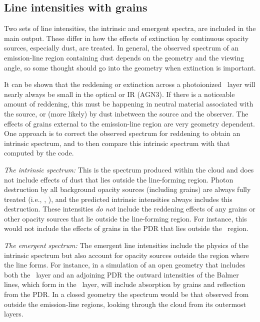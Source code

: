 \subsection{Line intensities with grains}

Two sets of line intensities, the intrinsic and emergent spectra, are
included in the main output.
These differ in how the effects of extinction by continuous opacity sources,
especially dust, are treated.
In general, the observed spectrum of an emission-line
region containing dust depends on the geometry and the viewing angle,
so some thought should go into the geometry when extinction is important.

It can be shown that the reddening or extinction across
a photoionized \hplus\ layer will nearly always be small in the optical or IR (AGN3).
If there is a noticeable amount of reddening, this must be happening in neutral material
associated with the source, or (more likely) by dust inbetween the source and the observer.
The effects of grains external to the emission-line region are very
geometry dependent.
One approach is to correct the observed spectrum for
reddening to obtain an intrinsic spectrum,
and to then compare this intrinsic
spectrum with that computed by the code.

\emph{The intrinsic spectrum:}
This is the spectrum produced within the cloud
and does not include effects of dust that lies outside the line-forming
region.
Photon destruction by all background opacity sources (including
grains) are always fully treated (i.e., \citealp{Hummer1968},
\citealp{Kalkofen1987}),
and the predicted intrinsic
intensities always includes this destruction.
These intensities \emph{do not}
include the reddening effects of any grains or
other opacity sources that
lie outside the line-forming region.
For instance, this would not include the effects of grains
in the PDR that lies outside the \hplus\ region.

\emph{The emergent spectrum:}  
The emergent line intensities include the physics of the intrinsic spectrum
but also account for opacity sources outside the region where the line forms.
For instance, in a simulation of an open geometry that includes both the \hplus\ layer and an adjoining
PDR the outward intensities of the Balmer lines, which form in the \hplus\ layer, 
will include absorption by grains and
reflection from the PDR.
In a closed geometry the spectrum would be that observed
from outside the emission-line regions, looking through the
cloud from its outermost layers.

